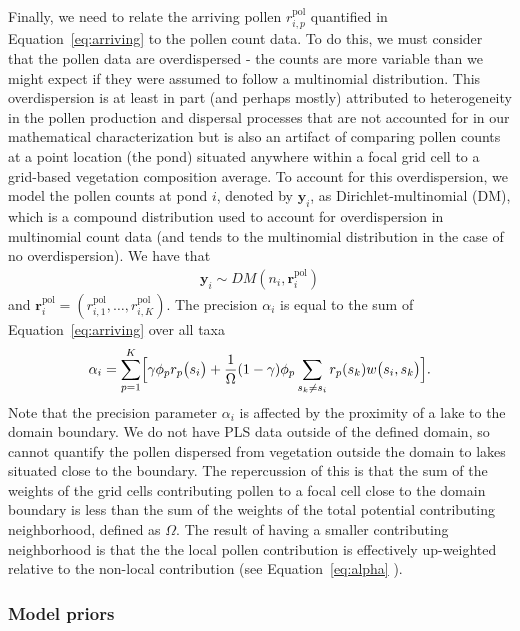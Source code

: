 \documentclass[12pt]{article}
\begin{document}
Finally, we need to relate the arriving pollen $r_{i,p}^{\text{pol}}$
quantified in Equation~\ref{eq:arriving} to the pollen count data. To
do this, we must consider that the pollen data are overdispersed - the
counts are more variable than we might expect if they were assumed to
follow a multinomial distribution. This overdispersion is at least in
part (and perhaps mostly) attributed to heterogeneity in the pollen
production and dispersal processes that are not accounted for in our
mathematical characterization but is also an artifact of comparing
pollen counts at a point location (the pond) situated anywhere within
a focal grid cell to a grid-based vegetation composition average. To
account for this overdispersion, we model the pollen counts at pond
$i$, denoted by $\bm{y}_i$, as Dirichlet-multinomial (DM), which is a
compound distribution used to account for overdispersion in
multinomial count data (and tends to the multinomial distribution in
the case of no overdispersion). We have that
\begin{align}
\bm{y}_i \sim DM (n_i, \bm{r}_i^{\text{pol}})
\label{eq:DM}
\end{align}
and $\bm{r}_i^{\text{pol}} = (r_{i,1}^{\text{pol}}, \ldots,
r_{i,K}^{\text{pol}})$.  The precision $\alpha_i$ is equal to the sum
of Equation~\ref{eq:arriving} over all taxa
\begin{align}
\alpha_i = \sum_{p=1}^K \Bigl[\gamma \phi_p r_p\bigl(s_i\bigr) + \frac{1}{\Omega} (1-\gamma) \phi_p \sum_{s_k \neq s_i } r_p(s_k) w\bigl(s_i, s_k\bigr)\Bigr].
\label{eq:alpha}
\end{align}
Note that the precision parameter $\alpha_i$ is affected by the
proximity of a lake to the domain boundary. We do not have PLS data
outside of the defined domain, so cannot quantify the pollen dispersed
from vegetation outside the domain to lakes situated close to the
boundary. The repercussion of this is that the sum of the weights of
the grid cells contributing pollen to a focal cell close to the domain
boundary is less than the sum of the weights of the total potential
contributing neighborhood, defined as $\Omega$. The result of having a
smaller contributing neighborhood is that the the local pollen
contribution is effectively up-weighted relative to the non-local
contribution (see Equation~\ref{eq:alpha} ).

\subsubsection{Model priors}
\end{document}
